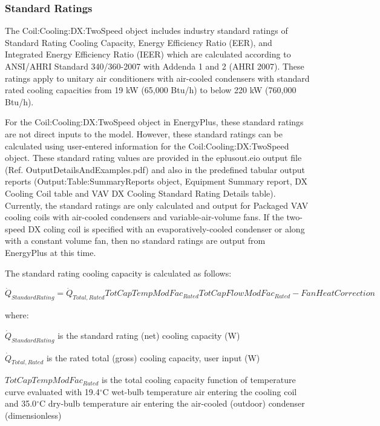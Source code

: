 \subsubsection{Standard Ratings}\label{standard-ratings}

The Coil:Cooling:DX:TwoSpeed object includes industry standard ratings of Standard Rating Cooling Capacity, Energy Efficiency Ratio (EER), and Integrated Energy Efficiency Ratio (IEER) which are calculated according to ANSI/AHRI Standard 340/360-2007 with Addenda 1 and 2 (AHRI 2007). These ratings apply to unitary air conditioners with air-cooled condensers with standard rated cooling capacities from 19 kW (65,000 Btu/h) to below 220 kW (760,000 Btu/h).

For the Coil:Cooling:DX:TwoSpeed object in EnergyPlus, these standard ratings are not direct inputs to the model. However, these standard ratings can be calculated using user-entered information for the Coil:Cooling:DX:TwoSpeed object. These standard rating values are provided in the eplusout.eio output file (Ref. OutputDetailsAndExamples.pdf) and also in the predefined tabular output reports (Output:Table:SummaryReports object, Equipment Summary report, DX Cooling Coil table and VAV DX Cooling Standard Rating Details table). Currently, the standard ratings are only calculated and output for Packaged VAV cooling coils with air-cooled condensers and variable-air-volume fans. If the two-speed DX coling coil is specified with an evaporatively-cooled condenser or along with a constant volume fan, then no standard ratings are output from EnergyPlus at this time.

The standard rating cooling capacity is calculated as follows:

\begin{equation}
\dot{Q}_{StandardRating} = \dot{Q}_{Total,Rated} TotCapTempModFac_{Rated} TotCapFlowModFac_{Rated} - FanHeatCorrection
\end{equation}

where:

\({\dot Q_{StandardRating}}\) is the standard rating (net) cooling capacity (W)

\({\dot Q_{Total,Rated}}\) is the rated total (gross) cooling capacity, user input (W)

\(TotCapTempModFa{c_{Rated}}\) is the total cooling capacity function of temperature curve evaluated with 19.4\(^{\circ}\)C wet-bulb temperature air entering the cooling coil and 35.0\(^{\circ}\)C dry-bulb temperature air entering the air-cooled (outdoor) condenser (dimensionless)

